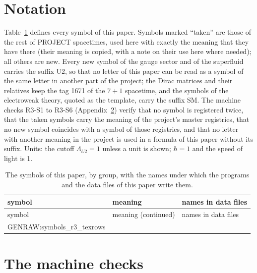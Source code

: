 \appendix
\onecolumngrid

\section{Notation}
\label{app:notation}

Table~\ref{tab:symbols} defines every symbol of this paper. Symbols marked ``taken'' are those of the
rest of PROJECT spacetimes, used here with exactly the meaning that they have there (their meaning is
copied, with a note on their use here where needed); all others are new. Every new symbol of the gauge
sector and of the superfluid carries the suffix U2, so that no letter of this paper can be read as a
symbol of the same letter in another part of the project; the Dirac matrices and their relatives keep
the tag 1671 of the $7+1$ spacetime, and the symbols of the electroweak theory, quoted as the template,
carry the suffix SM. The machine checks R3-S1 to R3-S6 (Appendix~\ref{app:checks}) verify that no
symbol is registered twice, that the taken symbols carry the meaning of the project's master
registries, that no new symbol coincides with a symbol of those registries, and that no letter with
another meaning in the project is used in a formula of this paper without its suffix. Units: the
cutoff $\Lambda_{U2}=1$ unless a unit is shown; $\hbar=1$ and the speed of light is 1.

{\small
\begin{longtable}{p{}p{}>{\raggedright\arraybackslash\footnotesize}p{}}
\caption{The symbols of this paper, by group, with the names under which the programs and the data
files of this paper write them.}\label{tab:symbols}\\
\toprule
symbol & meaning & names in data files\\
\midrule
\endfirsthead
\toprule
symbol & meaning (continued) & names in data files\\
\midrule
\endhead
\bottomrule
\endfoot
{{GENRAW:symbols_r3_texrows}}
\end{longtable}
}

\section{The machine checks}
\label{app:checks}

